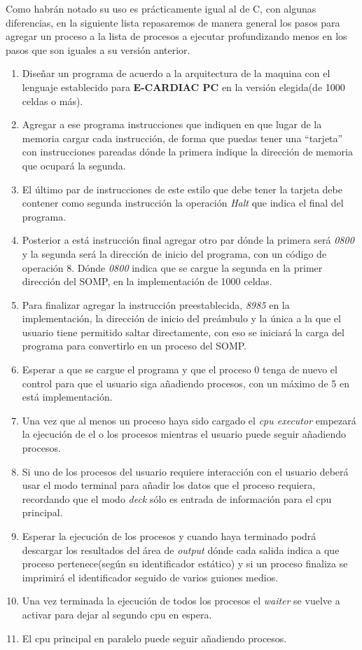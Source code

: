 \documentclass[letterpaper,12pt,oneside]{book}
\begin{document}
			Como habrán notado su uso es prácticamente igual al de C, con algunas diferencias, en la siguiente lista repasaremos de manera general
			los pasos para agregar un proceso a la lista de procesos a ejecutar profundizando menos en los pasos que son iguales a su versión anterior.			
			\begin{enumerate}

				\item Diseñar un programa de acuerdo a la arquitectura de la maquina con el lenguaje establecido para \textbf{E-CARDIAC PC} en
				la versión elegida(de 1000 celdas o más).
				\item Agregar a ese programa instrucciones que indiquen en que lugar de la memoria cargar cada instrucción, de forma que puedas tener
				una ``tarjeta'' con instrucciones pareadas dónde la primera indique la dirección de memoria que ocupará la segunda.
				\item El último par de instrucciones de este estilo que debe tener la tarjeta debe contener como segunda instrucción
				la operación \textit{Halt} que indica el final del programa.
				\item Posterior a está instrucción final agregar otro par dónde la primera será \textit{0800} y la segunda será la dirección de inicio del
				programa, con un código de operación 8. Dónde \textit{0800} indica que se cargue la segunda en la primer dirección del SOMP, en
				la implementación de 1000 celdas.
				\item Para finalizar agregar la instrucción preestablecida, \textit{8985} en la implementación, la dirección de inicio del preámbulo y
				la única a la que el usuario tiene permitido saltar directamente, con eso se iniciará la carga del programa para convertirlo en
				un proceso del SOMP.
				\item Esperar a que se cargue el programa y que el proceso 0 tenga de nuevo el control para que el usuario siga añadiendo procesos, con un
				máximo de 5 en está implementación.
				\item Una vez que al menos un proceso haya sido cargado el \textit{cpu executor} empezará la ejecución de el o los procesos
				mientras el usuario puede seguir añadiendo procesos.
				\item Si uno de los procesos del usuario requiere interacción con el usuario deberá usar el modo terminal para añadir los
				datos que el proceso requiera, recordando que el modo \textit{deck} sólo es entrada de información para el cpu principal.
				\item Esperar la ejecución de los procesos y cuando haya terminado podrá descargar los resultados del área de \textit{output} dónde
				cada salida indica a que proceso pertenece(según su identificador estático) y si un proceso finaliza se imprimirá el identificador
				seguido de varios guiones medios.
				\item Una vez terminada la ejecución de todos los procesos el \textit{waiter} se vuelve a activar para dejar al segundo cpu en espera.
				\item El cpu principal en paralelo puede seguir añadiendo procesos.
				
			\end{enumerate}
			
\end{document}
